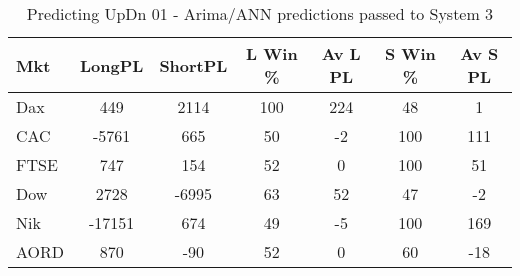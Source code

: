 \begin{table}[ht]
\centering
\caption[Predicting UpDn 01 - Arima/ANN predictions passed to System 3.]{Predicting UpDn 01 - Arima/ANN predictions passed to System 3} 
\label{tab:chp_ts:pUD_01_arima_ann_sys}
\begin{tabular}{lcccccc}
  \toprule Mkt & LongPL & ShortPL & L Win \% & Av L PL & S Win \% & Av S PL \\ 
  \midrule Dax & 449 & 2114 & 100 & 224 & 48 & 1 \\ 
  CAC & -5761 & 665 & 50 & -2 & 100 & 111 \\ 
  FTSE & 747 & 154 & 52 & 0 & 100 & 51 \\ 
  Dow & 2728 & -6995 & 63 & 52 & 47 & -2 \\ 
  Nik & -17151 & 674 & 49 & -5 & 100 & 169 \\ 
  AORD & 870 & -90 & 52 & 0 & 60 & -18 \\ 
   \bottomrule \end{tabular}
\end{table}
